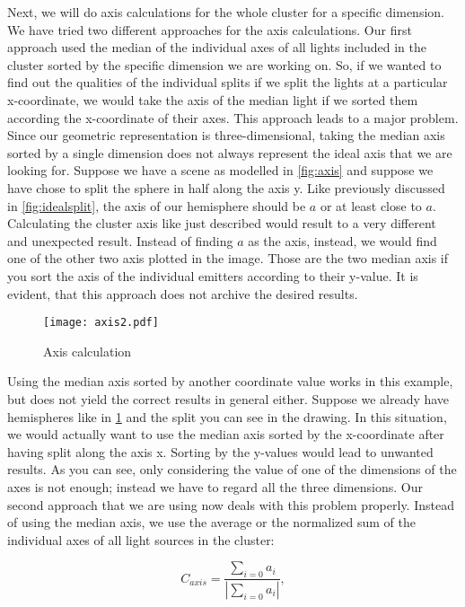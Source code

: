 Next, we will do axis calculations for the whole cluster for a specific dimension. We have tried two different approaches for the axis calculations. Our first approach used the median of the individual axes of all lights included in the cluster sorted by the specific dimension we are working on. So, if we wanted to find out the qualities of the individual splits if we split the lights at a particular x-coordinate, we would take the axis of the median light if we sorted them according the x-coordinate of their axes. This approach leads to a major problem. Since our geometric representation is three-dimensional, taking the median axis sorted by a single dimension does not always represent the ideal axis that we are looking for. Suppose we have a scene as modelled in \ref{fig:axis} and suppose we have chose to split the sphere in half along the axis y. Like previously discussed in \ref{fig:idealsplit}, the axis of our hemisphere should be $a$ or at least close to $a$. Calculating the cluster axis like just described would result to a very different and unexpected result. Instead of finding $a$ as the axis, instead, we would find one of the other two axis plotted in the image. Those are the two median axis if you sort the axis of the individual emitters according to their y-value. It is evident, that this approach does not archive the desired results. 

\begin{figure}
	\begin{center}
		\texttt{[image: axis2.pdf]}
		\caption{Axis calculation}
		\label{fig:axis2}
	\end{center}
\end{figure}


Using the median axis sorted by another coordinate value works in this example, but does not yield the correct results in general either. Suppose we already have hemispheres like in \ref{fig:axis2} and the split you can see in the drawing. In this situation, we would actually want to use the median axis sorted by the x-coordinate after having split along the axis x. Sorting by the y-values would lead to unwanted results. As you can see, only considering the value of one of the dimensions of the axes is not enough; instead we have to regard all the three dimensions. Our second approach that we are using now deals with this problem properly. Instead of using the median axis, we use the average or the normalized sum of the individual axes of all light sources in the cluster:

\begin{equation}
C_{axis} = \frac{\sum_{i = 0} a_i}{|\sum_{i = 0} a_i|},
\end{equation}


